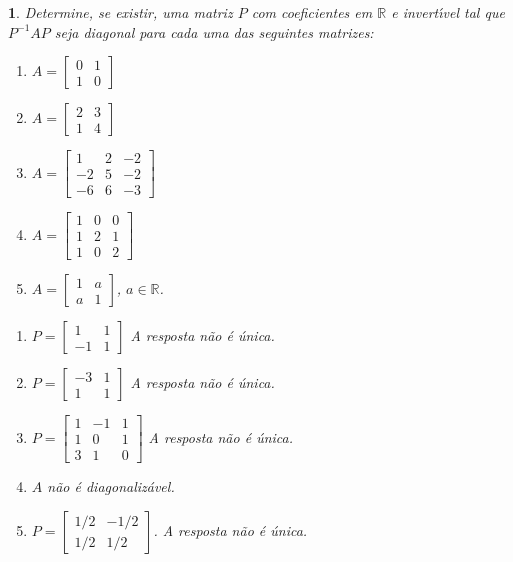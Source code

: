 \documentclass[12pt]{exam}
\newtheorem{exercicio}{}
\newcommand{\real}{\mathbb{R}}
\begin{document}
\begin{exercicio}
  Determine, se existir, uma matriz $P$ com coeficientes em $\real$ e invert{\'\i}vel tal que $P^{-1}AP$ seja diagonal para cada uma das seguintes matrizes:
    \begin{enumerate}[label=({\alph*})]
      \item $A = \begin{bmatrix} 0 & 1\\ 1 & 0\end{bmatrix}$
      \item $A = \begin{bmatrix} 2 & 3\\ 1 & 4\end{bmatrix}$
      \item $A = \begin{bmatrix} 1 & 2 & -2\\ -2 & 5 & -2\\ -6 & 6 & -3\end{bmatrix}$
      \item $A = \begin{bmatrix} 1 & 0 & 0\\ 1 & 2 & 1\\ 1 & 0 & 2\end{bmatrix}$
      \item $A = \begin{bmatrix} 1 & a \\ a & 1\end{bmatrix}$, $a \in \real$.
    \end{enumerate}
    \begin{solucao}
      \begin{enumerate}[label=({\alph*})]
        \item $P = \begin{bmatrix}
          1 & 1\\ -1 & 1
        \end{bmatrix}$ A resposta n\~ao \'e \'unica.
        \item $P = \begin{bmatrix}
          -3 & 1\\ 1 & 1
        \end{bmatrix}$ A resposta n\~ao \'e \'unica.
        \item $P = \begin{bmatrix}
          1 & -1 & 1\\ 1 & 0 & 1\\ 3 & 1 & 0
        \end{bmatrix}$ A resposta n\~ao \'e \'unica.
        \item $A$ n\~ao \'e diagonaliz\'avel.
        \item $P = \begin{bmatrix} 1/2 & -1/2\\ 1/2 & 1/2\end{bmatrix}$. A resposta n\~ao \'e \'unica.
      \end{enumerate}
    \end{solucao}

\end{exercicio}
\end{document}
